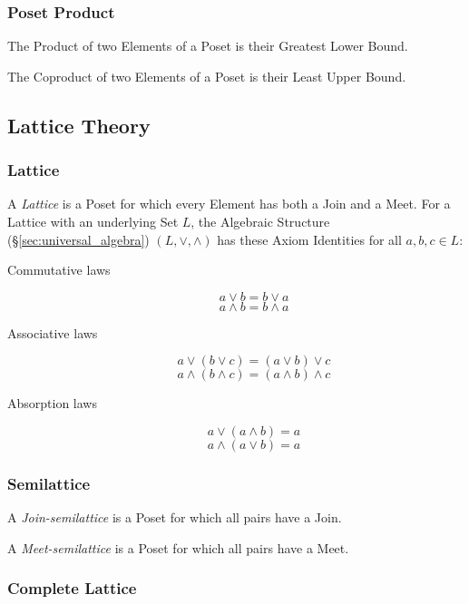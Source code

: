 \subsubsection{Poset Product}\label{sec:poset_product}

The Product of two Elements of a Poset is their Greatest Lower Bound.

The Coproduct of two Elements of a Poset is their Least Upper Bound.



\subsection{Lattice Theory}\label{sec:lattice_theory}

\subsubsection{Lattice}\label{sec:lattice}

A \emph{Lattice} is a Poset for which every Element has both a Join
and a Meet. For a Lattice with an underlying Set $L$, the Algebraic
Structure (\S\ref{sec:universal_algebra}) $(L, \vee, \wedge)$ has
these Axiom Identities for all $a,b,c \in L$:
\begin{description}
\item[Commutative laws]
\[
    a \vee b = b \vee a
\] \[
    a \wedge b = b \wedge a
\]
\item[Associative laws]
\[
    a \vee (b \vee c) = (a \vee b) \vee c
\] \[
    a \wedge (b \wedge c) = (a \wedge b) \wedge c
\]
\item[Absorption laws]
\[
    a \vee (a \wedge b) = a
\] \[
    a \wedge (a \vee b) = a
\]
\end{description}



\subsubsection{Semilattice}\label{sec:semilattice}

A \emph{Join-semilattice} is a Poset for which all pairs have a Join.

A \emph{Meet-semilattice} is a Poset for which all pairs have a Meet.



\subsubsection{Complete Lattice}\label{sec:complete_lattice}

